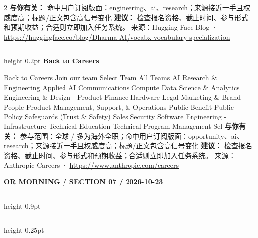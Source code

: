 \documentclass[10.5pt]{ctexart}
\begin{document}
\begin{multicols}{2}
\textbf{与你有关：} 命中用户订阅版面：engineering、ai、research；来源接近一手且权威度高；标题/正文包含高信号变化
\textbf{建议：} 检查报名资格、截止时间、参与形式和预期收益；合适则立即加入任务系统。
{\footnotesize\color{ormuted} 来源：Hugging Face Blog · \url{https://huggingface.co/blog/Dharma-AI/vocabx-vocabulary-specialization}}
\vspace{2mm}
\hrule height 0.2pt
\vspace{2mm}
{\large\bfseries Back to Careers}\par
Back to Careers Join our team Select Team All Teams AI Research \& Engineering Applied AI Communications Compute Data Science \& Analytics Engineering \& Design - Product Finance Hardware Legal Marketing \& Brand People Product Management, Support, \& Operations Public Benefit Public Policy Safeguards (Trust \& Safety) Sales Security Software Engineering - Infrastructure Technical Education Technical Program Management Sel
\textbf{与你有关：} 参与范围：全球 / 多为海外全职；命中用户订阅版面：opportunity、ai、research；来源接近一手且权威度高；标题/正文包含高信号变化
\textbf{建议：} 检查报名资格、截止时间、参与形式和预期收益；合适则立即加入任务系统。
{\footnotesize\color{ormuted} 来源：Anthropic Careers · \url{https://www.anthropic.com/careers}}
\end{multicols}
\newpage
{\small\bfseries OR MORNING / SECTION 07 / 2026-10-23}
\vspace{2mm}
\hrule height 0.9pt
\vspace{1.5mm}
\hrule height 0.25pt
\vspace{4mm}
\end{document}
